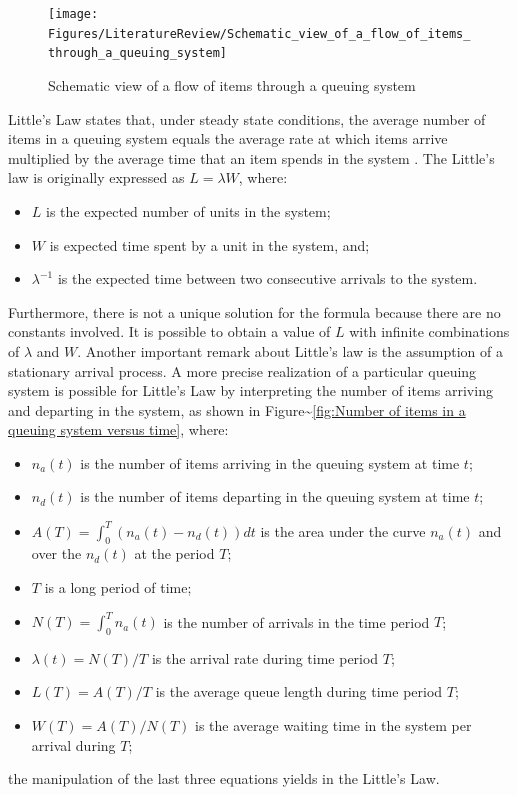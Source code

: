 \documentclass{article}
\begin{document}
\begin{figure}[H]
  \centering
  \texttt{[image: Figures/LiteratureReview/Schematic\_view\_of\_a\_flow\_of\_items\_through\_a\_queuing\_system]}
  \caption{Schematic view of a flow of items through a queuing system}\label{fig:Schematic view of a flow of items through a queuing system}
\end{figure}

Little's Law states that, under steady state conditions, the average number of items in a queuing system equals the average rate at which items arrive multiplied by the average time that an item spends in the system \citep[p. 82]{Little2008}.
The Little's law is originally expressed as \(L=\lambda W\), where:

\begin{itemize}
    \item $L$ is the expected number of units in the system;
    \item $W$ is expected time spent by a unit in the system, and;
    \item $\lambda^{-1}$ is the expected time between two consecutive arrivals to the system.
\end{itemize}

Furthermore, there is not a unique solution for the formula because there are no constants involved.
It is possible to obtain a value of \(L\) with infinite combinations of \(\lambda\) and \(W\).
Another important remark about Little's law is the assumption of a stationary arrival process.
A more precise realization of a particular queuing system is possible for Little's Law by interpreting the number of items arriving and departing in the system, as shown in Figure\textasciitilde{}\ref{fig:Number of items in a queuing system versus time}, where:

\begin{itemize}
    \item $n_a(t)$ is the number of items arriving in the queuing system at time $t$;
    \item $n_d(t)$ is the number of items departing in the queuing system at time $t$;
    \item $A(T)=\int_0^T (n_a(t)-n_d(t))dt$ is the area under the curve $n_a(t)$ and over the $n_d(t)$ at the period $T$;
    \item $T$ is a long period of time;
    \item $N(T)=\int_0^{T}n_a(t)$ is the number of arrivals in the time period $T$;
    \item $\lambda(t)=N(T)/T$ is the arrival rate during time period $T$;
    \item $L(T)=A(T)/T$ is the average queue length during time period $T$;
    \item $W(T)=A(T)/N(T)$ is the average waiting time in the system per arrival during $T$;
\end{itemize}
\nobreak the manipulation of the last three equations yields in the Little's Law.
\end{document}
